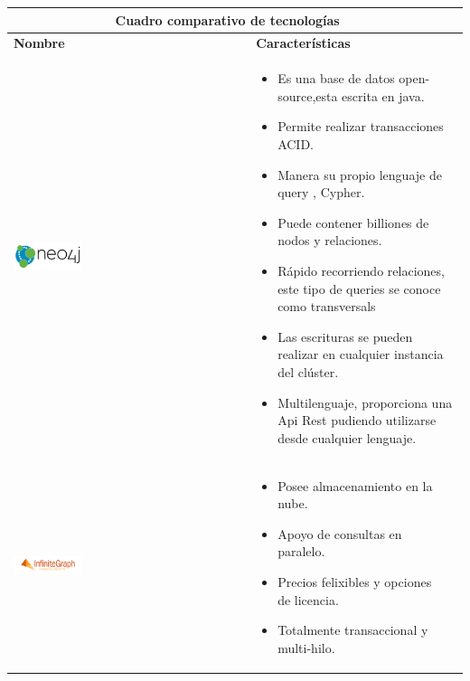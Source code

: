 \newpage
	\begin{table}[b!]
    \centering
      \begin{tabular}{|p{2cm}|ll}
        \hline
        \multicolumn{2}{|c|}{{\bf Cuadro comparativo de tecnologías}} \\ 
        \hline
          \multicolumn{1}{|p{4cm}|}{{\bf Nombre}} & 
		  \multicolumn{1}{p{10cm}|}{{\bf Características}}\\
        \hline
          \multicolumn{1}{|p{5cm}|}{\includegraphics[width=0.3\textwidth]{images/neo4j}} & 
          \multicolumn{2}{p{10cm}|}{\begin{itemize}
          \vspace{-15mm}
        \item Es una base de datos open-source,esta escrita en java.
        \item Permite realizar transacciones ACID.
        \item Manera su propio lenguaje de query , Cypher.
        \item Puede contener billiones de nodos y relaciones.
        \item Rápido recorriendo relaciones, este tipo de queries se conoce como transversals
        \item Las escrituras se pueden realizar en cualquier instancia del clúster.
        \item Multilenguaje, proporciona una Api Rest pudiendo utilizarse desde cualquier lenguaje.
        \cite{31}
      \end{itemize}} \\
        \hline
          \multicolumn{1}{|p{5cm}|}{\includegraphics[width=0.3\textwidth]{images/InfiniteGraph}} & 
          \multicolumn{1}{p{10cm}|}{
          \begin{itemize}
          \vspace{-7mm}
        \item Posee almacenamiento en la nube.
        \item Apoyo de consultas en paralelo.
        \item Precios felixibles y opciones de licencia.
        \item Totalmente transaccional y multi-hilo.

\end{itemize}}
\end{tabular}
\end{table}
